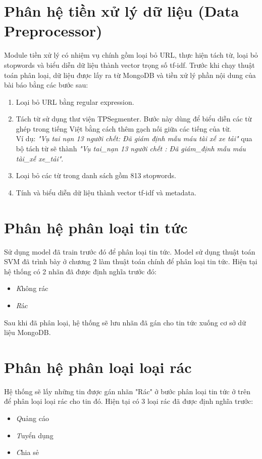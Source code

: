 \section{Phân hệ tiền xử lý dữ liệu (Data Preprocessor)}
\label{sec:DataPreprocessor}
Module tiền xử lý có nhiệm vụ chính gồm loại bỏ URL, thực hiện tách từ, loại bỏ stopwords và biểu diễn dữ liệu thành vector trọng số tf-idf. Trước khi chạy thuật toán phân loại, dữ liệu được lấy ra từ MongoDB và tiền xử lý phần nội dung của bài báo bằng các bước sau:
	\begin{enumerate}
		\item Loại bỏ URL bằng regular expression.
		\item Tách từ sử dụng thư viện TPSegmenter. Bước này dùng để biểu diễn các từ ghép trong tiếng Việt bằng cách thêm gạch nối giữa các tiếng của từ.\\
		Ví dụ: \textit{"Vụ tai nạn 13 người chết: Đã giám định mẫu máu tài xế xe tải"} qua bộ tách từ sẽ thành \textit{"Vụ tai\_nạn 13 người chết : Đã giám\_định mẫu máu tài\_xế xe\_tải"}.
		\item Loại bỏ các từ trong danh sách gồm 813 stopwords.
		\item Tính và biểu diễn dữ liệu thành vector tf-idf và metadata.
	\end{enumerate}

\section{Phân hệ phân loại tin tức}
\label{sec:newsClassify}
Sử dụng model đã train trước đó để phân loại tin tức. Model sử dụng thuật toán SVM đã trình bày ở chương 2 làm thuật toán chính để phân loại tin tức. Hiện tại hệ thống có 2 nhãn đã được định nghĩa trước đó:
	\begin{itemize}
		\item \textit Không rác
		\item \textit Rác
	\end{itemize}

Sau khi đã phân loại, hệ thống sẽ lưu nhãn đã gán cho tin tức xuống cơ sở dữ liệu MongoDB.

\section{Phân hệ phân loại loại rác}
\label{sec:spamCategory}
Hệ thống sẽ lấy những tin được gán nhãn "Rác" ở bước phân loại tin tức ở trên để phân loại loại rác cho tin đó. Hiện tại có 3 loại rác đã được định nghĩa trước:
\begin{itemize}
	\item \textit Quảng cáo
	\item \textit Tuyển dụng
	\item \textit Chia sẻ
\end{itemize}

